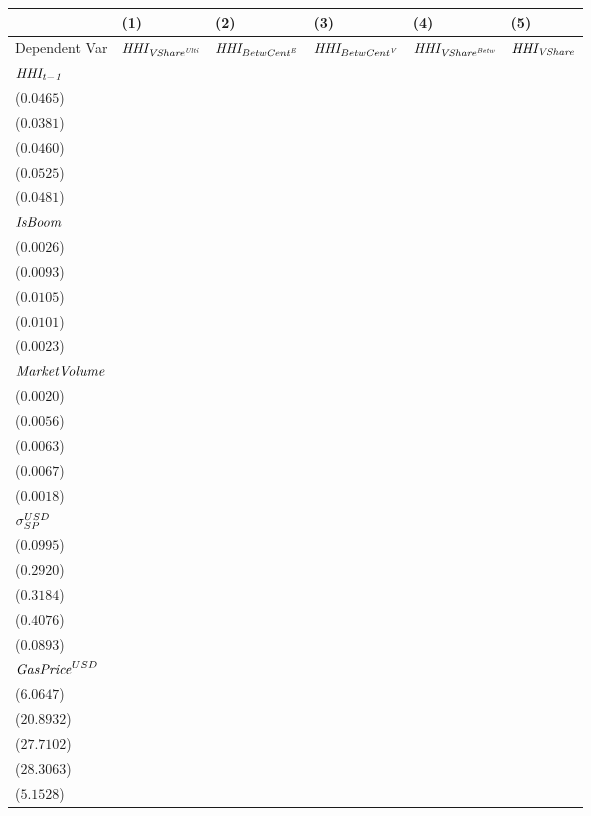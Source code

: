 \begin{tabular}{llllll}
\toprule
 & (1) & (2) & (3) & (4) & (5) \\
\midrule
Dependent Var & ${\it HHI_{{VShare}^{\it Ulti}}}$ & ${\it HHI_{{BetwCent}^{\it E}}}$ & ${\it HHI_{{BetwCent}^{\it V}}}$ & ${\it HHI_{{VShare}^{\it Betw}}}$ & ${\it HHI_{VShare}}$ \\
$\it HHI_{t-1}$ & \makecell{$0.4546^{***}$ \\ ($0.0465$)} & \makecell{$0.6299^{***}$ \\ ($0.0381$)} & \makecell{$0.6447^{***}$ \\ ($0.0460$)} & \makecell{$0.5648^{***}$ \\ ($0.0525$)} & \makecell{$0.4449^{***}$ \\ ($0.0481$)} \\
${\it IsBoom}$ & \makecell{$-0.0018^{}$ \\ ($0.0026$)} & \makecell{$0.0345^{***}$ \\ ($0.0093$)} & \makecell{$0.0428^{***}$ \\ ($0.0105$)} & \makecell{$0.0420^{***}$ \\ ($0.0101$)} & \makecell{$0.0036^{}$ \\ ($0.0023$)} \\
${\it MarketVolume}$ & \makecell{$0.0018^{}$ \\ ($0.0020$)} & \makecell{$-0.0005^{}$ \\ ($0.0056$)} & \makecell{$-0.0071^{}$ \\ ($0.0063$)} & \makecell{$0.0021^{}$ \\ ($0.0067$)} & \makecell{$0.0018^{}$ \\ ($0.0018$)} \\
${\it \sigma}^{USD}_{SP}$ & \makecell{$0.1267^{}$ \\ ($0.0995$)} & \makecell{$0.3516^{}$ \\ ($0.2920$)} & \makecell{$-0.6414^{**}$ \\ ($0.3184$)} & \makecell{$-0.6178^{}$ \\ ($0.4076$)} & \makecell{$0.0185^{}$ \\ ($0.0893$)} \\
${\it GasPrice}^{USD}$ & \makecell{$-16.6760^{***}$ \\ ($6.0647$)} & \makecell{$46.9715^{**}$ \\ ($20.8932$)} & \makecell{$49.7317^{*}$ \\ ($27.7102$)} & \makecell{$-37.0482^{}$ \\ ($28.3063$)} & \makecell{$-13.1549^{**}$ \\ ($5.1528$)} \\

\end{tabular}
